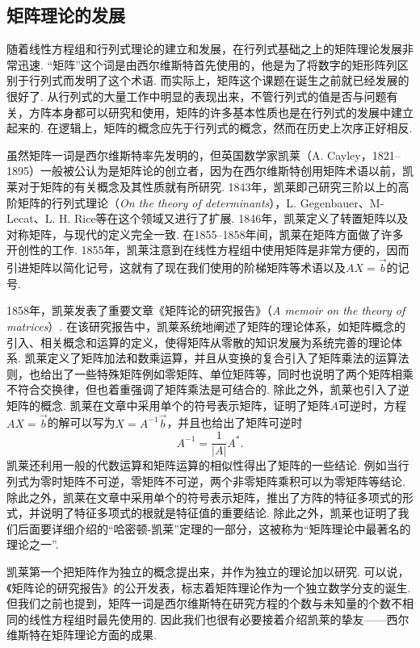 \subsection{矩阵理论的发展}

随着线性方程组和行列式理论的建立和发展，在行列式基础之上的矩阵理论发展非常迅速. ``矩阵''这个词是由西尔维斯特首先使用的，他是为了将数字的矩形阵列区别于行列式而发明了这个术语. 而实际上，矩阵这个课题在诞生之前就已经发展的很好了. 从行列式的大量工作中明显的表现出来，不管行列式的值是否与问题有关，方阵本身都可以研究和使用，矩阵的许多基本性质也是在行列式的发展中建立起来的. 在逻辑上，矩阵的概念应先于行列式的概念，然而在历史上次序正好相反.

虽然矩阵一词是西尔维斯特率先发明的，但英国数学家凯莱（A. Cayley，1821--1895）一般被公认为是矩阵论的创立者，因为在西尔维斯特创用矩阵术语以前，凯莱对于矩阵的有关概念及其性质就有所研究. 1843年，凯莱即己研究三阶以上的高阶矩阵的行列式理论（\emph{On the theory of determinants}），L. Gegenbauer、M-Lecat、L. H. Rice等在这个领域又进行了扩展. 1846年，凯莱定义了转置矩阵以及对称矩阵，与现代的定义完全一致. 在1855--1858年间，凯莱在矩阵方面做了许多开创性的工作. 1855年，凯莱注意到在线性方程组中使用矩阵是非常方便的，因而引进矩阵以简化记号，这就有了现在我们使用的阶梯矩阵等术语以及$AX=\vec{b}$的记号.

1858年，凯莱发表了重要文章《矩阵论的研究报告》（\emph{A memoir on the theory of matrices}）. 在该研究报告中，凯莱系统地阐述了矩阵的理论体系，如矩阵概念的引入、相关概念和运算的定义，使得矩阵从零散的知识发展为系统完善的理论体系. 凯莱定义了矩阵加法和数乘运算，并且从变换的复合引入了矩阵乘法的运算法则，也给出了一些特殊矩阵例如零矩阵、单位矩阵等，同时也说明了两个矩阵相乘不符合交换律，但也着重强调了矩阵乘法是可结合的. 除此之外，凯莱也引入了逆矩阵的概念. 凯莱在文章中采用单个的符号表示矩阵，证明了矩阵$A$可逆时，方程$AX=\vec{b}$的解可以写为$X=A^{-1}\vec{b}$，并且也给出了矩阵可逆时
\[A^{-1}=\frac{1}{|A|}A^*.\]
凯莱还利用一般的代数运算和矩阵运算的相似性得出了矩阵的一些结论. 例如当行列式为零时矩阵不可逆，零矩阵不可逆，两个非零矩阵乘积可以为零矩阵等结论. 除此之外，凯莱在文章中采用单个的符号表示矩阵，推出了方阵的特征多项式的形式，并说明了特征多项式的根就是特征值的重要结论. 除此之外，凯莱也证明了我们后面要详细介绍的``哈密顿-凯莱''定理的一部分，这被称为``矩阵理论中最著名的理论之一''.

凯莱第一个把矩阵作为独立的概念提出来，并作为独立的理论加以研究. 可以说，《矩阵论的研究报告》的公开发表，标志着矩阵理论作为一个独立数学分支的诞生. 但我们之前也提到，矩阵一词是西尔维斯特在研究方程的个数与未知量的个数不相同的线性方程组时最先使用的. 因此我们也很有必要接着介绍凯莱的挚友——西尔维斯特在矩阵理论方面的成果.

